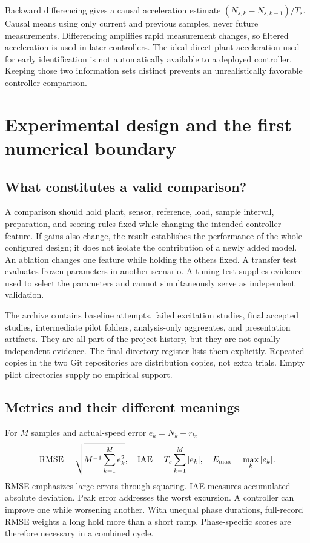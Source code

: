 Backward differencing gives a causal acceleration estimate $(N_{s,k}-N_{s,k-1})/T_s$. Causal means using only current and previous samples, never future measurements. Differencing amplifies rapid measurement changes, so filtered acceleration is used in later controllers. The ideal direct plant acceleration used for early identification is not automatically available to a deployed controller. Keeping those two information sets distinct prevents an unrealistically favorable controller comparison.

\chapter{Experimental design and the first numerical boundary}
\section{What constitutes a valid comparison?}
A comparison should hold plant, sensor, reference, load, sample interval, preparation, and scoring rules fixed while changing the intended controller feature. If gains also change, the result establishes the performance of the whole configured design; it does not isolate the contribution of a newly added model. An ablation changes one feature while holding the others fixed. A transfer test evaluates frozen parameters in another scenario. A tuning test supplies evidence used to select the parameters and cannot simultaneously serve as independent validation.

The archive contains baseline attempts, failed excitation studies, final accepted studies, intermediate pilot folders, analysis-only aggregates, and presentation artifacts. They are all part of the project history, but they are not equally independent evidence. The final directory register lists them explicitly. Repeated copies in the two Git repositories are distribution copies, not extra trials. Empty pilot directories supply no empirical support.

\section{Metrics and their different meanings}
For $M$ samples and actual-speed error $e_k=N_k-r_k$,
\begin{equation}\operatorname{RMSE}=\sqrt{M^{-1}\sum_{k=1}^M e_k^2},\quad
\mathrm{IAE}=T_s\sum_{k=1}^M|e_k|,\quad E_{\max}=\max_k|e_k|.
\end{equation}
RMSE emphasizes large errors through squaring. IAE measures accumulated absolute deviation. Peak error addresses the worst excursion. A controller can improve one while worsening another. With unequal phase durations, full-record RMSE weights a long hold more than a short ramp. Phase-specific scores are therefore necessary in a combined cycle.

